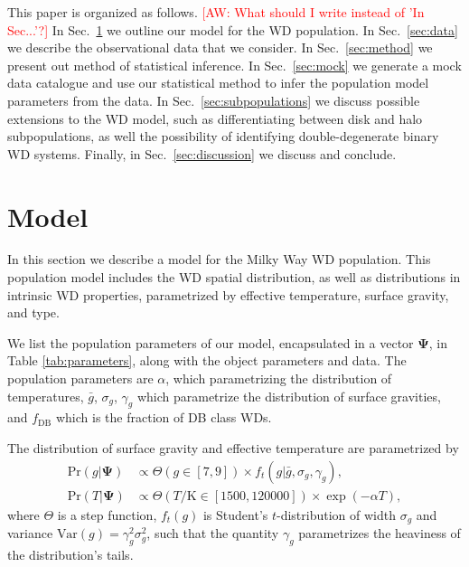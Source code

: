 \documentclass[fleqn,usenatbib]{mnras}
\newcommand{\aw}[1]{\textcolor{red}{[AW: #1]}}
\newcommand{\popp}{\boldsymbol{\Psi}}
\newcommand{\Teff}{T}
\newcommand{\logg}{g}
\newcommand{\pr}{\text{Pr}}
\newcommand{\K}{\text{K}}
\begin{document}
This paper is organized as follows. \aw{What should I write instead of 'In Sec...'?} In Sec.~\ref{sec:model} we outline our model for the WD population. In Sec.~\ref{sec:data} we describe the observational data that we consider. In Sec.~\ref{sec:method} we present out method of statistical inference. In Sec.~\ref{sec:mock} we generate a mock data catalogue and use our statistical method to infer the population model parameters from the data. In Sec.~\ref{sec:subpopulations} we discuss possible extensions to the WD model, such as differentiating between disk and halo subpopulations, as well the possibility of identifying double-degenerate binary WD systems. Finally, in Sec.~\ref{sec:discussion} we discuss and conclude.





\section{Model}\label{sec:model}

In this section we describe a model for the Milky Way WD population. This population model includes the WD spatial distribution, as well as distributions in intrinsic WD properties, parametrized by effective temperature, surface gravity, and type.

We list the population parameters of our model, encapsulated in a vector $\popp$, in Table \ref{tab:parameters}, along with the object parameters and data. The population parameters are $\alpha$, which parametrizing the distribution of temperatures, $\bar{g}$, $\sigma_g$, $\gamma_g$ which parametrize the distribution of surface gravities, and $f_\text{DB}$ which is the fraction of DB class WDs.

The distribution of surface gravity and effective temperature are parametrized by
\begin{equation}\label{eq:T&g}
\begin{split}
	\pr(\logg | \popp) & \propto \Theta(\logg \in [7,9]) \times f_t(\logg|\bar{g},\sigma_g,\gamma_g),\\
    \pr(\Teff | \popp) & \propto \Theta(\Teff/\K \in [1500,120000]) \times \exp (-\alpha \Teff),
\end{split}
\end{equation}
where $\Theta$ is a step function, $f_t(\logg)$ is Student's $t$-distribution of width $\sigma_g$ and variance $\text{Var}(g) = \gamma_g^2 \sigma_g^2$, such that the quantity $\gamma_g$ parametrizes the heaviness of the distribution's tails.
\end{document}
